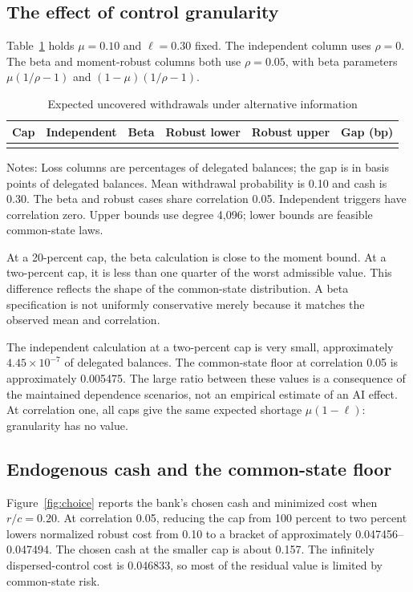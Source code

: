 \documentclass[11pt]{article}
\theoremstyle{definition}\newtheorem{definition}[theorem]{Definition}
\begin{document}
\subsection{The effect of control granularity}
Table~\ref{tab:risk} holds \(\mu=0.10\) and \(\ell=0.30\) fixed. The independent column uses \(\rho=0\). The beta and moment-robust columns both use \(\rho=0.05\), with beta parameters \(\mu(1/\rho-1)\) and \((1-\mu)(1/\rho-1)\).

\begin{table}[t]
\centering\small
\caption{Expected uncovered withdrawals under alternative information}
\label{tab:risk}
\begin{tabular}{rrrrrr}
\toprule
Cap & Independent & Beta & Robust lower & Robust upper & Gap (bp)\\
\midrule
{}{table-risk.tex}
\bottomrule
\end{tabular}
\begin{minipage}{\linewidth}\footnotesize\vspace{3pt}
Notes: Loss columns are percentages of delegated balances; the gap is in basis points of delegated balances. Mean withdrawal probability is 0.10 and cash is 0.30. The beta and robust cases share correlation 0.05. Independent triggers have correlation zero. Upper bounds use degree 4,096; lower bounds are feasible common-state laws.
\end{minipage}
\end{table}

At a 20-percent cap, the beta calculation is close to the moment bound. At a two-percent cap, it is less than one quarter of the worst admissible value. This difference reflects the shape of the common-state distribution. A beta specification is not uniformly conservative merely because it matches the observed mean and correlation.

The independent calculation at a two-percent cap is very small, approximately \(4.45\times10^{-7}\) of delegated balances. The common-state floor at correlation 0.05 is approximately 0.005475. The large ratio between these values is a consequence of the maintained dependence scenarios, not an empirical estimate of an AI effect. At correlation one, all caps give the same expected shortage \(\mu(1-\ell)\): granularity has no value.

\subsection{Endogenous cash and the common-state floor}
Figure~\ref{fig:choice} reports the bank's chosen cash and minimized cost when \(r/c=0.20\). At correlation 0.05, reducing the cap from 100 percent to two percent lowers normalized robust cost from 0.10 to a bracket of approximately 0.047456--0.047494. The chosen cash at the smaller cap is about 0.157. The infinitely dispersed-control cost is 0.046833, so most of the residual value is limited by common-state risk.
\end{document}
